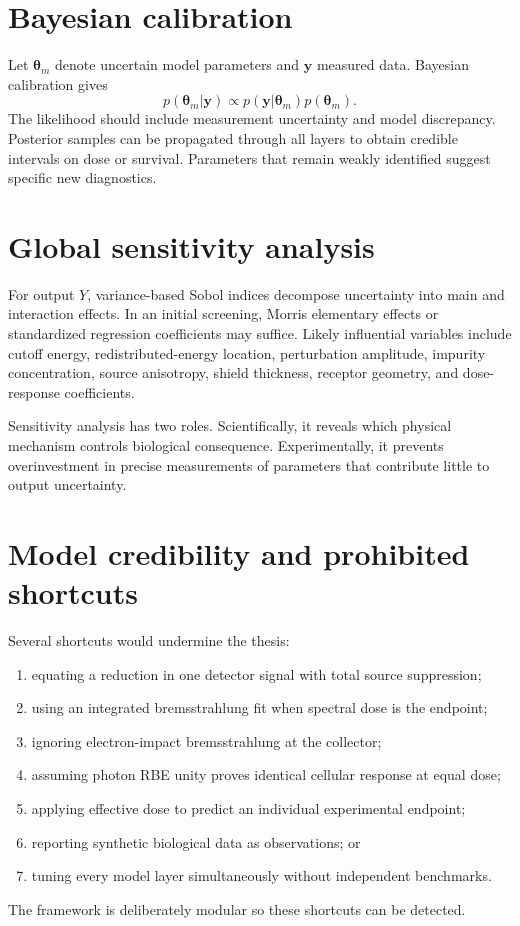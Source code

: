 \section{Bayesian calibration}

Let $\boldsymbol{\theta}_m$ denote uncertain model parameters and $\mathbf{y}$ measured data. Bayesian calibration gives
\begin{equation}
p(\boldsymbol{\theta}_m|\mathbf{y})
\propto p(\mathbf{y}|\boldsymbol{\theta}_m)p(\boldsymbol{\theta}_m).
\end{equation}
The likelihood should include measurement uncertainty and model discrepancy. Posterior samples can be propagated through all layers to obtain credible intervals on dose or survival. Parameters that remain weakly identified suggest specific new diagnostics.

\section{Global sensitivity analysis}

For output $Y$, variance-based Sobol indices decompose uncertainty into main and interaction effects. In an initial screening, Morris elementary effects or standardized regression coefficients may suffice. Likely influential variables include cutoff energy, redistributed-energy location, perturbation amplitude, impurity concentration, source anisotropy, shield thickness, receptor geometry, and dose-response coefficients.

Sensitivity analysis has two roles. Scientifically, it reveals which physical mechanism controls biological consequence. Experimentally, it prevents overinvestment in precise measurements of parameters that contribute little to output uncertainty.

\section{Model credibility and prohibited shortcuts}

Several shortcuts would undermine the thesis:
\begin{enumerate}
\item equating a reduction in one detector signal with total source suppression;
\item using an integrated bremsstrahlung fit when spectral dose is the endpoint;
\item ignoring electron-impact bremsstrahlung at the collector;
\item assuming photon RBE unity proves identical cellular response at equal dose;
\item applying effective dose to predict an individual experimental endpoint;
\item reporting synthetic biological data as observations; or
\item tuning every model layer simultaneously without independent benchmarks.
\end{enumerate}
The framework is deliberately modular so these shortcuts can be detected.

